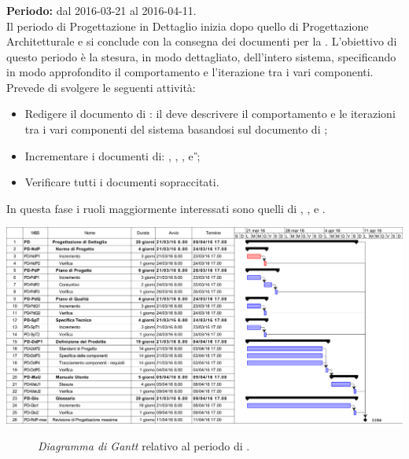 \subsubsection{\PD}
\textbf{Periodo:} dal 2016-03-21 al 2016-04-11. \\
Il periodo di Progettazione in Dettaglio inizia dopo quello di Progettazione Architetturale e si conclude con la consegna dei documenti per la \RP. L'obiettivo di questo periodo è la stesura, in modo dettagliato, dell'intero sistema, specificando in modo approfondito il comportamento e l'iterazione tra i vari componenti. \\
Prevede di svolgere le seguenti attività:
\begin{itemize}
	\item Redigere il documento di \textit{\DDP}: il \textit{\Prog} deve descrivere il comportamento e le iterazioni tra i vari componenti del sistema basandosi sul documento di \textit{\ST};  
	\item Incrementare i documenti di: \textit{\NdP}, \textit{\PdP}, \textit{\PdQ}, \textit{\ST} e \textit{\G};
	\item Verificare tutti i documenti sopraccitati.
\end{itemize}
In questa fase i ruoli maggiormente interessati sono quelli di \textit{\Amm}, \textit{\Res}, \textit{\Prog} e \textit{\Ver}. 
\begin{center}
	\includegraphics[keepaspectratio = true, width=16cm]{immagini/PdP_ProgettazioneDiDettaglioGantt.png}
\end{center}
\begin{figure}[h]
	\caption{\textit{Diagramma di Gantt} relativo al periodo di \PD.}\label{etichetta}
\end{figure}

